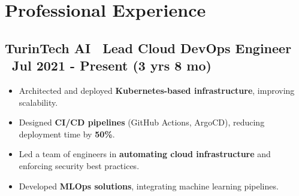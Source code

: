 \documentclass[a4paper,10pt]{article}
\begin{document}




\section*{ Professional Experience}

\subsection*{TurinTech AI \textbar\ Lead Cloud DevOps Engineer \textbar\ Jul 2021 - Present (3 yrs 8 mo)}
\begin{itemize}[left=0pt]
    \item Architected and deployed \textbf{Kubernetes-based infrastructure}, improving scalability.
    \item Designed \textbf{CI/CD pipelines} (GitHub Actions, ArgoCD), reducing deployment time by \textbf{50\%}.
    \item Led a team of engineers in \textbf{automating cloud infrastructure} and enforcing security best practices.
    \item Developed \textbf{MLOps solutions}, integrating machine learning pipelines.
\end{itemize}
\end{document}
